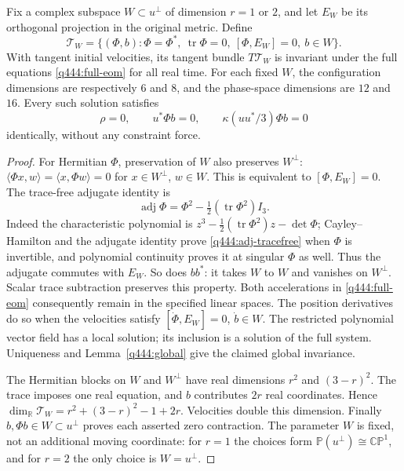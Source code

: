 \begin{theorem}\label{q444:invariant-W}
Fix a complex subspace $W\subset u^\perp$ of dimension $r=1$ or $2$, and
let $E_W$ be its orthogonal projection in the original metric. Define
\[
 \mathcal T_W=\{(\Phi,b):\Phi=\Phi^*,\ \operatorname{tr}\Phi=0,
                       \ [\Phi,E_W]=0,\ b\in W\}.
\]
With tangent initial velocities, its tangent bundle $T\mathcal T_W$ is
invariant under the full equations \eqref{q444:full-eom} for all real time.
For each fixed $W$, the configuration dimensions are respectively $6$
and $8$, and the phase-space dimensions are $12$ and $16$. Every such
solution satisfies
\[
 \rho=0,\qquad u^*\Phi b=0,\qquad \kappa(uu^*/3)\Phi b=0
\]
identically, without any constraint force.
\end{theorem}
\begin{proof}
For Hermitian $\Phi$, preservation of $W$ also preserves $W^\perp$:
$\langle\Phi x,w\rangle=\langle x,\Phi w\rangle=0$ for
$x\in W^\perp$, $w\in W$. This is equivalent to $[\Phi,E_W]=0$.
The trace-free adjugate identity is
\begin{equation}\label{q444:adj-tracefree}
 \operatorname{adj}\Phi=\Phi^2-\tfrac12(\operatorname{tr}\Phi^2)I_3.
\end{equation}
Indeed the characteristic polynomial is
$z^3-\tfrac12(\operatorname{tr}\Phi^2)z-\det\Phi$;
Cayley--Hamilton and the adjugate identity prove
\eqref{q444:adj-tracefree} when $\Phi$ is invertible, and polynomial
continuity proves it at singular $\Phi$ as well. Thus the adjugate
commutes with $E_W$. So does $bb^*$: it takes $W$ to $W$ and vanishes
on $W^\perp$. Scalar trace subtraction preserves this property.
Both accelerations in \eqref{q444:full-eom} consequently remain in the
specified linear spaces. The position derivatives do so when the
velocities satisfy $[\dot\Phi,E_W]=0$, $\dot b\in W$.
The restricted polynomial vector field has a local solution; its inclusion
is a solution of the full system. Uniqueness and Lemma~\ref{q444:global}
give the claimed global invariance.

The Hermitian blocks on $W$ and $W^\perp$ have real dimensions $r^2$
and $(3-r)^2$. The trace imposes one real equation, and $b$ contributes
$2r$ real coordinates. Hence
$\dim_{\mathbb R}\mathcal T_W=r^2+(3-r)^2-1+2r$.
Velocities double this dimension. Finally $b,\Phi b\in W\subset u^\perp$
proves each asserted zero contraction. The parameter $W$ is fixed, not
an additional moving coordinate: for $r=1$ the choices form
$\mathbb P(u^\perp)\cong\mathbb{CP}^1$, and for $r=2$ the only choice is
$W=u^\perp$.
\end{proof}

